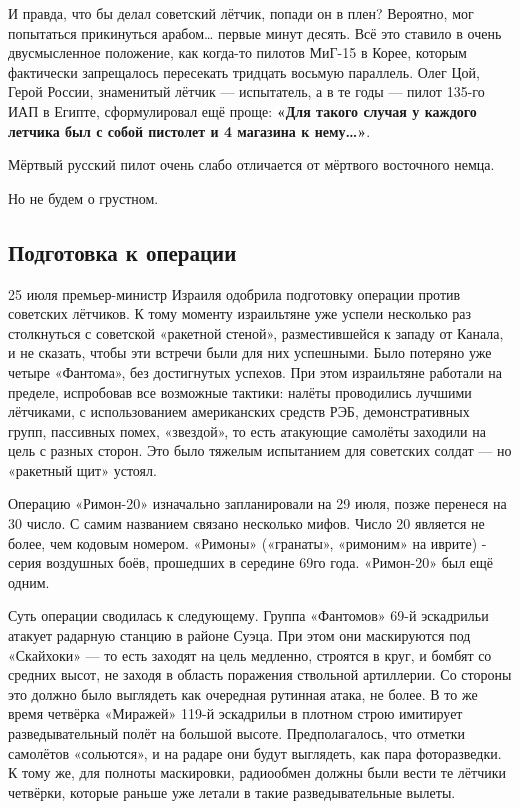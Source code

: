 И правда, что бы делал советский лётчик, попади он в плен? Вероятно, мог попытаться прикинуться арабом… первые минут десять. Всё это ставило в очень двусмысленное положение, как когда-то пилотов МиГ-15 в Корее, которым фактически запрещалось пересекать тридцать восьмую параллель. Олег Цой, Герой России, знаменитый лётчик — испытатель, а в те годы — пилот 135-го ИАП в Египте, сформулировал ещё проще:  \textbf{«Для такого случая у каждого летчика был с собой пистолет и 4 магазина к нему…»}.

Мёртвый русский пилот очень слабо отличается от мёртвого восточного немца.

Но не будем о грустном. 

\subsection{Подготовка к операции}

25 июля премьер-министр Израиля одобрила подготовку операции против советских лётчиков. К тому моменту израильтяне уже успели несколько раз столкнуться с советской «ракетной стеной», разместившейся к западу от Канала, и не сказать, чтобы эти встречи были для них успешными. Было потеряно уже четыре «Фантома», без достигнутых успехов. При этом израильтяне работали на пределе, испробовав все возможные тактики: налёты проводились лучшими лётчиками, с использованием американских средств РЭБ, демонстративных групп, пассивных помех, «звездой», то есть атакующие самолёты заходили на цель с разных сторон. Это было тяжелым испытанием для советских солдат — но «ракетный щит» устоял.

Операцию «Римон-20» изначально запланировали на 29 июля, позже перенеся на 30 число. С самим названием связано несколько мифов. Число 20 является не более, чем кодовым номером. «Римоны» («гранаты», «римоним» на иврите) - серия воздушных боёв, прошедших в середине 69го года. «Римон-20» был ещё одним.

Суть операции сводилась к следующему. Группа «Фантомов» 69-й эскадрильи атакует радарную станцию в районе Суэца. При этом они маскируются под «Скайхоки» — то есть заходят на цель медленно, строятся в круг, и бомбят со средних высот, не заходя в область поражения ствольной артиллерии. Со стороны это должно было выглядеть как очередная рутинная атака, не более. В то же время четвёрка «Миражей» 119-й эскадрильи в плотном строю имитирует разведывательный полёт на большой высоте. Предполагалось, что отметки самолётов «сольются», и на радаре они будут выглядеть, как пара фоторазведки. К тому же, для полноты маскировки, радиообмен должны были вести те лётчики четвёрки, которые раньше уже летали в такие разведывательные вылеты. 

